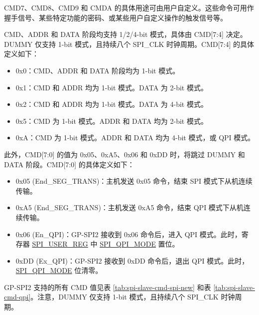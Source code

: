 \documentclass[main\_\_CN.tex]{subfiles}
\begin{document}
CMD7、CMD8、CMD9 和 CMDA 的具体用途可由用户自定义。这些命令可用作握手信号、某些特定功能的密码、或某些用户自定义操作的触发信号等。

CMD、ADDR 和 DATA 阶段均支持 1/2/4-bit 模式，具体由 CMD[7:4] 决定。DUMMY 仅支持 1-bit 模式，且持续八个 SPI\_CLK 时钟周期。CMD[7:4] 的具体定义如下：

\begin{itemize}
    \item 0x0：CMD、ADDR 和 DATA 阶段均为 1-bit 模式。
    \item 0x1：CMD 和 ADDR 均为 1-bit 模式。DATA 为 2-bit 模式。
    \item 0x2：CMD 和 ADDR 均为 1-bit 模式。DATA 为 4-bit 模式。
    \item 0x5：CMD 为 1-bit 模式。ADDR 和 DATA 均为 2-bit 模式。
    \item 0xA：CMD 为 1-bit 模式。ADDR 和 DATA 均为 4-bit 模式，或 QPI 模式。
\end{itemize}

此外，CMD[7:0] 的值为 0x05、0xA5、0x06 和 0xDD 时，将跳过 DUMMY 和 DATA 阶段。CMD[7:0] 的具体定义如下：

\begin{itemize}
    \item \label{cmd:ENDSEGTRANS}0x05 (End\_SEG\_TRANS)：主机发送 0x05 命令，结束 SPI 模式下从机连续传输。
    \item 0xA5 (End\_SEG\_TRANS)：主机发送 0xA5 命令，结束 QPI 模式下从机连续传输。 
    \item 0x06 (En\_QPI)：GP-SPI2 接收到 0x06 命令后，进入 QPI 模式。此时，寄存器 \hyperref[regdesc:SPIUSERREG]{SPI\_USER\_REG} 中 \hyperref[fielddesc:SPIQPIMODE]{SPI\_QPI\_MODE} 置位。
    \item 0xDD (Ex\_QPI)：GP-SPI2 接收到 0xDD 命令后，退出 QPI 模式。此时， \hyperref[fielddesc:SPIQPIMODE]{SPI\_QPI\_MODE} 位清零。
\end{itemize}


GP-SPI2 支持的所有 CMD 值见表 \ref{tab:spi-slave-cmd-spi-new} 和表 \ref{tab:spi-slave-cmd-qpi}。注意，DUMMY 仅支持 1-bit 模式，且持续八个 SPI\_CLK 时钟周期。
\end{document}
